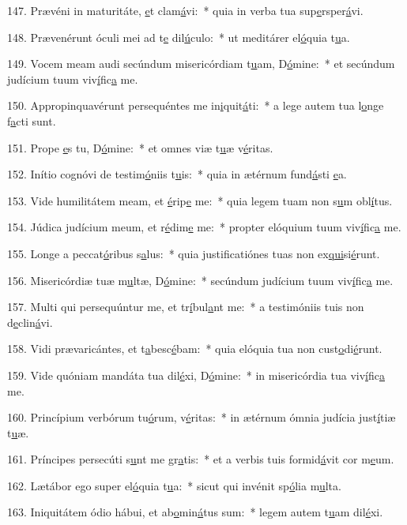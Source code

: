 147. Prævéni in maturitáte, \uline{e}t clam\uline{á}vi:~* quia in verba tua sup\uline{e}rsper\uline{á}vi.\par 
148. Prævenérunt óculi mei ad t\uline{e} dil\uline{ú}culo:~* ut meditárer el\uline{ó}quia t\uline{u}a.\par 
149. Vocem meam audi secúndum misericórdiam t\uline{u}am, D\uline{ó}mine:~* et secúndum judícium tuum viv\uline{í}fic\uline{a} me.\par 
150. Appropinquavérunt persequéntes me in\uline{i}quit\uline{á}ti:~* a lege autem tua l\uline{o}nge f\uline{a}cti sunt.\par 
151. Prope \uline{e}s tu, D\uline{ó}mine:~* et omnes viæ t\uline{u}æ v\uline{é}ritas.\par 
152. Inítio cognóvi de testim\uline{ó}niis t\uline{u}is:~* quia in ætérnum fund\uline{á}sti \uline{e}a.\par 
153. Vide humilitátem meam, et \uline{é}rip\uline{e} me:~* quia legem tuam non s\uline{u}m obl\uline{í}tus.\par 
154. Júdica judícium meum, et r\uline{é}dim\uline{e} me:~* propter elóquium tuum viv\uline{í}fic\uline{a} me.\par 
155. Longe a peccat\uline{ó}ribus s\uline{a}lus:~* quia justificatiónes tuas non ex\uline{qui}si\uline{é}runt.\par 
156. Misericórdiæ tuæ m\uline{u}ltæ, D\uline{ó}mine:~* secúndum judícium tuum viv\uline{í}fic\uline{a} me.\par 
157. Multi qui persequúntur me, et tr\uline{í}bul\uline{a}nt me:~* a testimóniis tuis non d\uline{e}clin\uline{á}vi.\par 
158. Vidi prævaricántes, et t\uline{a}besc\uline{é}bam:~* quia elóquia tua non cust\uline{o}di\uline{é}runt.\par 
159. Vide quóniam mandáta tua dil\uline{é}xi, D\uline{ó}mine:~* in misericórdia tua viv\uline{í}fic\uline{a} me.\par 
160. Princípium verbórum tu\uline{ó}rum, v\uline{é}ritas:~* in ætérnum ómnia judícia just\uline{í}tiæ t\uline{u}æ.\par 
161. Príncipes persecúti s\uline{u}nt me gr\uline{a}tis:~* et a verbis tuis formid\uline{á}vit cor m\uline{e}um.\par 
162. Lætábor ego super el\uline{ó}quia t\uline{u}a:~* sicut qui invénit sp\uline{ó}lia m\uline{u}lta.\par 
163. Iniquitátem ódio hábui, et ab\uline{o}min\uline{á}tus sum:~* legem autem t\uline{u}am dil\uline{é}xi.\par 
